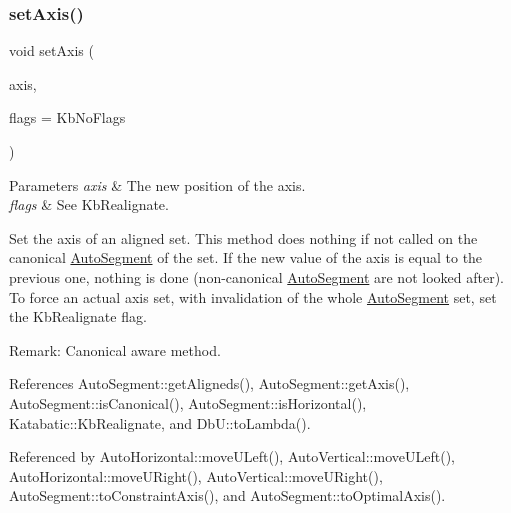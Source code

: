 \subsubsection{\texorpdfstring{set\+Axis()}{setAxis()}}
{\footnotesize\ttfamily void set\+Axis (\begin{DoxyParamCaption}\item[{\textbf{ Db\+U\+::\+Unit}}]{axis,  }\item[{unsigned int}]{flags = {\ttfamily KbNoFlags} }\end{DoxyParamCaption})}


\begin{DoxyParams}{Parameters}
{\em axis} & The new position of the axis. \\
\hline
{\em flags} & See Kb\+Realignate.\\
\hline
\end{DoxyParams}
Set the axis of an aligned set. This method does nothing if not called on the canonical \mbox{\hyperlink{classKatabatic_1_1AutoSegment}{Auto\+Segment}} of the set. If the new value of the axis is equal to the previous one, nothing is done (non-\/canonical \mbox{\hyperlink{classKatabatic_1_1AutoSegment}{Auto\+Segment}} are not looked after). To force an actual axis set, with invalidation of the whole \mbox{\hyperlink{classKatabatic_1_1AutoSegment}{Auto\+Segment}} set, set the Kb\+Realignate flag.

\begin{DoxyParagraph}{Remark\+: Canonical aware method. }

\end{DoxyParagraph}


References Auto\+Segment\+::get\+Aligneds(), Auto\+Segment\+::get\+Axis(), Auto\+Segment\+::is\+Canonical(), Auto\+Segment\+::is\+Horizontal(), Katabatic\+::\+Kb\+Realignate, and Db\+U\+::to\+Lambda().



Referenced by Auto\+Horizontal\+::move\+U\+Left(), Auto\+Vertical\+::move\+U\+Left(), Auto\+Horizontal\+::move\+U\+Right(), Auto\+Vertical\+::move\+U\+Right(), Auto\+Segment\+::to\+Constraint\+Axis(), and Auto\+Segment\+::to\+Optimal\+Axis().

\mbox{\label{classKatabatic_1_1AutoSegment_a8ab41a962e18810808f4f065863b5a73}} 
